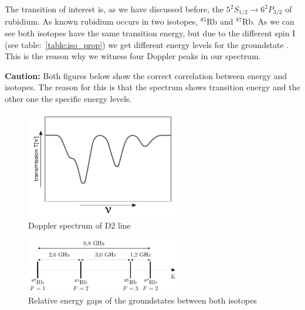 \vspace{\fill}

The transition of interest is, as we have discussed before, the \(5^{2}S_{1/2} \rightarrow 6^{2}P_{3/2}\) of rubidium. As known rubidium
occurs in two isotopes, \(^{85}\)Rb and \(^{87}\)Rb.
As we can see both isotopes have the same transition energy, but due to the different spin I (see table:~\ref{table:iso_prop}) we get
different energy levels for the groundstate \citep{nist_asd}. This is the reason why we witness four Doppler peaks in our spectrum.
\bigskip

\textbf{Caution:} Both figures below show the correct correlation between energy and isotopes. The reason for this is that the spectrum
shows transition energy and the other one the specific energy levels.

\vspace{\fill}

\begin{figure}[h]
\centering
\includegraphics[width=0.6\textwidth]{spectrum_doppler}
\caption{\label{fig:doppler}Doppler spectrum of D2 line} 
\end{figure}

\vspace{\fill}

\begin{figure}[ht]
\centering
\includegraphics[width=0.6\textwidth]{groundstate}
\caption{\label{fig:gap}Relative energy gaps of the groundstates between both isotopes} 
\end{figure}